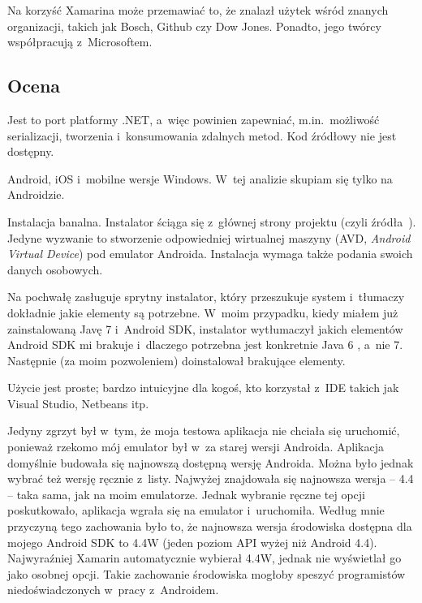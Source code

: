 Na korzyść Xamarina może przemawiać to, że znalazł użytek wśród znanych organizacji, takich jak Bosch, Github czy Dow Jones\cite{xamarin-overview}.
Ponadto, jego twórcy współpracują z~Microsoftem.


\subsection{Ocena}

\begin{description}
Jest to port platformy .NET, a~więc powinien zapewniać, m.in.\ możliwość serializacji, tworzenia i~konsumowania zdalnych metod.
Kod źródłowy nie jest dostępny.

Android, iOS i~mobilne wersje Windows. W~tej analizie skupiam się tylko na Androidzie. 

Instalacja banalna. Instalator ściąga się z~głównej strony projektu (czyli źródła~\cite{xamarin-overview}).
Jedyne wyzwanie to stworzenie odpowiedniej wirtualnej maszyny (AVD, \emph{Android Virtual Device}) pod emulator Androida.
Instalacja wymaga także podania swoich danych osobowych.

Na pochwałę zasługuje sprytny instalator, który przeszukuje system i~tłumaczy dokładnie jakie elementy są potrzebne.
W~moim przypadku, kiedy miałem już zainstalowaną Javę 7 i~Android SDK, instalator wytłumaczył jakich elementów Android SDK mi brakuje i~dlaczego potrzebna jest konkretnie Java 6 , a~nie 7. Następnie (za moim pozwoleniem) doinstalował brakujące elementy.

Użycie jest proste; bardzo intuicyjne dla kogoś, kto korzystał z~IDE takich jak Visual Studio, Netbeans itp.

Jedyny zgrzyt był w~tym, że moja testowa aplikacja nie chciała się uruchomić, ponieważ rzekomo mój emulator był w~za starej wersji Androida.
Aplikacja domyślnie budowała się najnowszą dostępną wersję Androida. Można było jednak wybrać też wersję ręcznie z~listy. Najwyżej znajdowała się najnowsza wersja -- 4.4 -- taka sama, jak na moim emulatorze. Jednak wybranie ręczne tej opcji poskutkowało, aplikacja wgrała się na emulator i~uruchomiła. Według mnie przyczyną tego zachowania było to, że najnowsza wersja środowiska dostępna dla mojego Android SDK to 4.4W (jeden poziom API wyżej niż Android 4.4). Najwyraźniej Xamarin automatycznie wybierał 4.4W, jednak nie wyświetlał go jako osobnej opcji. Takie zachowanie środowiska mogłoby speszyć programistów niedoświadczonych w~pracy z~Androidem.


\end{description}
